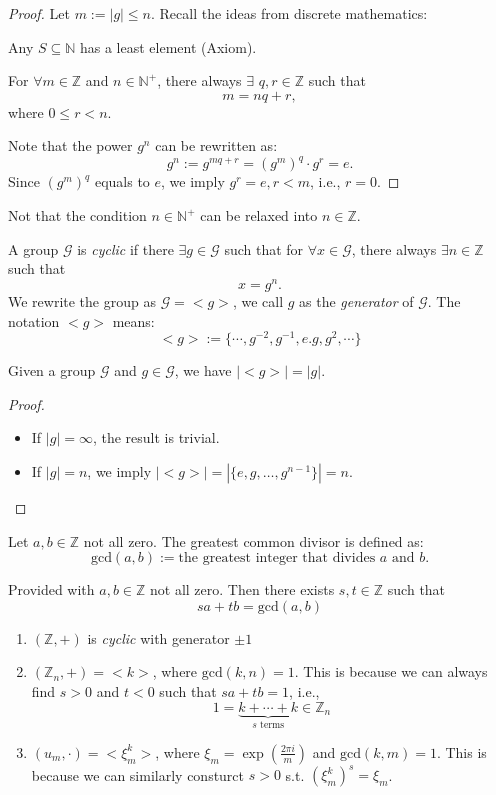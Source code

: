 \begin{proof}
Let $m:=|g|\le n$. Recall the ideas from discrete mathematics:
\begin{theorem}
Any $S\subseteq\mathbb{N}$ has a least element (Axiom).
\end{theorem}
\begin{theorem}
For $\forall m\in\mathbb{Z}$ and $n\in\mathbb{N}^+$, there always $\exists$ $q,r\in\mathbb{Z}$ such that
\[
 m = nq+r,
\]
where $0\le r<n$.
\end{theorem}
Note that the power $g^n$ can be rewritten as:
\[
g^n:=g^{mq+r}=(g^m)^q\cdot g^r=e.
\]
Since $(g^m)^q$ equals to $e$, we imply $g^r = e, r<m$, i.e., $r=0$.
\end{proof}
\begin{remark}
Not that the condition $n\in\mathbb{N}^+$ can be relaxed into $n\in\mathbb{Z}$.
\end{remark}
\begin{definition}[cyclic]
A group $\mathcal{G}$ is \emph{cyclic} if there $\exists g\in\mathcal{G}$ such that for $\forall x\in\mathcal{G}$, there always $\exists n\in\mathbb{Z}$ such that
\[
x = g^n.
\]
We rewrite the group as $\mathcal{G} = <g>$, we call $g$ as the \emph{generator} of $\mathcal{G}.$ The notation $<g>$ means:
\[
<g>:=\{\cdots,g^{-2},g^{-1},e.g,g^2,\cdots\}
\]
\end{definition}
\begin{proposition}
Given a group $\mathcal{G}$ and $g\in\mathcal{G}$, we have $|<g>|=|g|$.
\end{proposition}
\begin{proof}
\begin{itemize}
\item
If $|g|=\infty$, the result is trivial.
\item
If $|g|=n$, we imply $|<g>| = |\{e,g,\dots,g^{n-1}\}|=n.$
\end{itemize}
\end{proof}
\begin{definition}
Let $a,b\in\mathbb{Z}$ not all zero. The greatest common divisor is defined as:
\[
\mbox{gcd}(a,b):=\mbox{the greatest integer that divides $a$ and $b$.}
\]
\end{definition}
\begin{theorem}[Bezout]
Provided with $a,b\in\mathbb{Z}$ not all zero. Then there exists $s,t\in\mathbb{Z}$ such that 
\[
sa+tb = \mbox{gcd}(a,b)
\]
\end{theorem}
\begin{example}
\begin{enumerate}
\item
$(\mathbb{Z},+)$ is \emph{cyclic} with generator $\pm1$
\item
$(\mathbb{Z}_n,+) = <k>$, where $\mbox{gcd}(k,n)=1$.  This is because we can always find $s>0$ and $t<0$ such that $sa+tb = 1$, i.e.,
\[
1=\underbrace{k+\cdots+k}_{\text{$s$ terms}}\in\mathbb{Z}_n
\]
\item
$(u_m,\cdot) = <\xi_{m}^k>$, where $\xi_{m} = \exp(\frac{2\pi i}{m})$ and $\mbox{gcd}(k,m)=1$. This is because we can similarly consturct $s>0$ s.t. $(\xi^k_m)^s=\xi_m$.
\end{enumerate}
\end{example}

